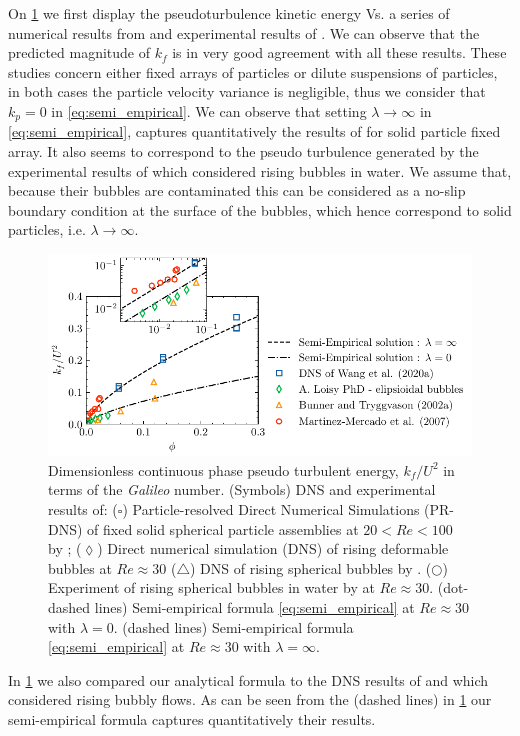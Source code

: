 On \ref{fig:trygvason} we first display the pseudoturbulence kinetic energy Vs. a series of numerical results from \citet{bunner2002dynamics,loisy2016direct,wang2021numerical} and experimental results of \citet{martinez2007measurement}.  
We can observe that the predicted magnitude of $k_f$ is in very good agreement with all these results. 
These studies concern either fixed arrays of particles or dilute suspensions of particles, in both cases the particle velocity variance is negligible, thus we consider that $k_p = 0$ in \ref{eq:semi_empirical}. 
We can observe that setting $\lambda \to\infty$ in \ref{eq:semi_empirical}, captures quantitatively the results of \citet{wang2021numerical} for solid particle fixed array. 
It also seems to correspond to the pseudo turbulence generated by the experimental results of \citet{martinez2007measurement} which considered rising bubbles in water. 
We assume that, because their bubbles are contaminated this can be considered as a no-slip boundary condition at the surface of the bubbles, which hence correspond to solid particles, i.e. $\lambda \to \infty$.  
\begin{figure}
    \centering
    \includegraphics[height = 0.35\textwidth]{image/HOMOGENEOUS_final/CA/KFliterature.pdf}
    \caption{Dimensionless continuous phase pseudo turbulent energy, $k_f/U^2$ in terms of the \textit{Galileo} number.
    (Symbols) DNS and experimental results of: 
    ($\pmb\square$)  Particle-resolved Direct Numerical Simulations (PR-DNS)
    of fixed solid spherical particle assemblies at $20< Re < 100$  by \citet{wang2021numerical}; 
    ($\pmb\lozenge$) Direct numerical simulation (DNS) of rising deformable bubbles at $Re \approx 30$ \citep{loisy2016direct}
    ($\pmb\triangle$) DNS of rising spherical bubbles by \citet{bunner2002dynamics}. 
    ($\pmb\bigcirc$) Experiment of rising spherical bubbles in water by \citet{martinez2007measurement} at $Re \approx 30$. 
    (dot-dashed lines) Semi-empirical formula \ref{eq:semi_empirical} at $Re \approx 30$ with $\lambda = 0$. 
    (dashed lines)  Semi-empirical formula \ref{eq:semi_empirical} at $Re \approx 30$ with $\lambda = \infty$.
    }
    \label{fig:trygvason}
\end{figure}
In \ref{fig:trygvason} we also compared our analytical formula to the DNS results of \citet{bunner2002dynamics} and \citet{loisy2016direct} which considered rising bubbly flows. 
As can be seen from the (dashed lines) in \ref{fig:trygvason} our semi-empirical formula captures quantitatively their results. 

